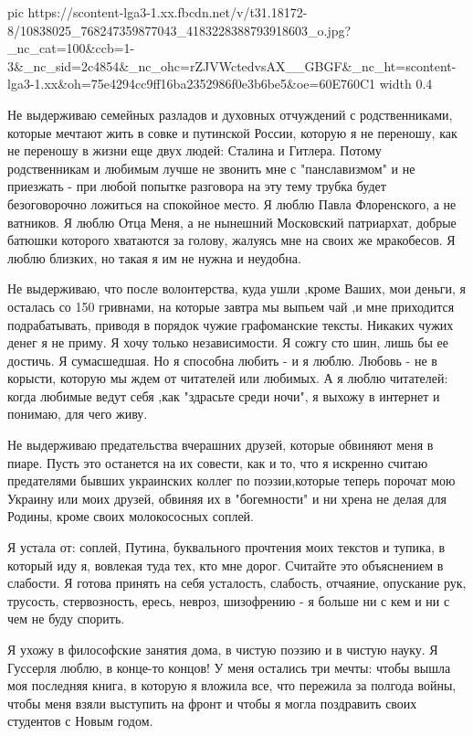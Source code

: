 \ifcmt
  pic https://scontent-lga3-1.xx.fbcdn.net/v/t31.18172-8/10838025_768247359877043_4183228388793918603_o.jpg?_nc_cat=100&ccb=1-3&_nc_sid=2c4854&_nc_ohc=rZJVWctedvsAX__GBGF&_nc_ht=scontent-lga3-1.xx&oh=75e4294cc9ff16ba2352986f0e3b6be5&oe=60E760C1
  width 0.4
\fi

Не выдерживаю семейных разладов и духовных отчуждений с родственниками, которые
мечтают жить в совке и путинской России, которую я не переношу, как не переношу
в жизни еще двух людей: Сталина и Гитлера. Потому родственникам и любимым лучше
не звонить мне с "панславизмом" и не приезжать - при любой попытке разговора на
эту тему трубка будет безоговорочно  ложиться на спокойное место. Я люблю Павла
Флоренского, а не ватников. Я люблю Отца Меня, а не нынешний Московский
патриархат, добрые батюшки которого хватаются за голову, жалуясь мне на своих
же мракобесов.  Я люблю близких, но такая я им не нужна и неудобна. 

Не выдерживаю, что после волонтерства, куда ушли ,кроме Ваших, мои деньги, я
осталась со 150 гривнами, на которые завтра мы выпьем чай ,и мне приходится
подрабатывать, приводя в порядок чужие графоманские тексты. Никаких чужих денег
я не приму. Я хочу только независимости. Я сожгу сто шин, лишь бы ее достичь. Я
сумасшедшая. Но я способна любить - и я люблю. Любовь - не в корысти, которую
мы ждем от читателей или любимых. А я люблю читателей: когда любимые ведут себя
,как "здрасьте среди ночи", я выхожу в интернет и понимаю, для чего живу.  

Не выдерживаю предательства вчерашних друзей, которые обвиняют меня в пиаре.
Пусть это останется на их совести, как и то, что я искренно считаю
предателями бывших украинских коллег по поэзии,которые теперь порочат мою
Украину или моих друзей, обвиняя их в "богемности" и ни хрена не делая для
Родины, кроме своих молокососных соплей. 

Я устала от: соплей, Путина, буквального прочтения моих текстов и тупика, в
который иду я, вовлекая туда тех, кто мне дорог. Считайте это объяснением в
слабости. Я готова принять на себя усталость, слабость, отчаяние, опускание
рук, трусость, стервозность, ересь, невроз, шизофрению - я больше  ни с кем и
ни  с чем не буду спорить. 

Я ухожу в философские занятия дома, в чистую поэзию и в чистую науку. Я
Гуссерля люблю, в конце-то концов! У меня остались три мечты: чтобы вышла моя
последняя книга, в которую я вложила все, что пережила за полгода войны, чтобы
меня взяли выступить на фронт и чтобы я могла поздравить своих студентов с
Новым годом. 

